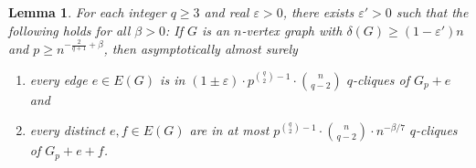 \documentclass[11pt]{article}
\numberwithin{equation}{section}
\newcommand{\eps}{\varepsilon}
\newcounter{i}
\theoremstyle{plain}
\newtheorem{lem}[thm]{Lemma}
\theoremstyle{plain} %
\theoremstyle{definition}
\begin{document}
\begin{lem}\label{lem:RandomReserve}
For each integer $q\ge 3$ and real $\eps > 0$, there exists $\varepsilon' > 0$ such that the following holds for all $\beta > 0$: If $G$ is an $n$-vertex graph with $\delta(G)\ge (1-\varepsilon')n$  and $p\ge n^{-\frac{2}{q+1} +\beta}$, then asymptotically almost surely 
\begin{enumerate}[label=(\arabic*)]
    \item\label{RandomReserve:degree} every edge $e \in E(G)$ is in $(1 \pm \eps)\cdot p^{\binom{q}{2}-1}\cdot \binom{n}{q - 2}$ $q$-cliques of $G_p + e$ and 
    \item\label{RandomReserve:codegree} every distinct $e,f \in E(G)$ are in at most $p^{\binom{q}{2} - 1}\cdot \binom{n}{q -2}\cdot n^{-\beta / 7}$ $q$-cliques of $G_p + e + f$. 
\end{enumerate}
\end{lem}
\end{document}
